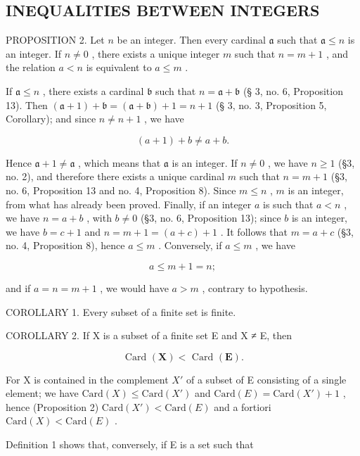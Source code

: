 \subsection{INEQUALITIES BETWEEN INTEGERS}

PROPOSITION 2. Let \(n\) be an integer. Then every cardinal \(\mathfrak{a}\) such that \(\mathfrak{a} \leqslant n\) is an integer. If \(n \neq 0\) , there exists a unique integer \(m\) such that \(n = m + 1\) , and the relation \(a < n\) is equivalent to \(a \leqslant m\) .

If \(\mathfrak{a} \leqslant n\) , there exists a cardinal \(\mathfrak{b}\) such that \(n = \mathfrak{a} + \mathfrak{b}\) (§ 3, no. 6, Proposition 13). Then \((\mathfrak{a} + 1) + \mathfrak{b} = (\mathfrak{a} + \mathfrak{b}) + 1 = n + 1\) (§ 3, no. 3, Proposition 5, Corollary); and since \(n \neq n + 1\) , we have

\[
(a + 1) + b \neq a + b.
\]

Hence \(\mathfrak{a} + 1 \neq \mathfrak{a}\) , which means that \(\mathfrak{a}\) is an integer. If \(n \neq 0\) , we have \(n \geqslant 1\) (§3, no. 2), and therefore there exists a unique cardinal \(m\) such that \(n = m + 1\) (§3, no. 6, Proposition 13 and no. 4, Proposition 8). Since \(m \leqslant n\) , \(m\) is an integer, from what has already been proved. Finally, if an integer \(a\) is such that \(a < n\) , we have \(n = a + b\) , with \(b \neq 0\) (§3, no. 6, Proposition 13); since \(b\) is an integer, we have \(b = c + 1\) and \(n = m + 1 = (a + c) + 1\) . It follows that \(m = a + c\) (§3, no. 4, Proposition 8), hence \(a \leqslant m\) . Conversely, if \(a \leqslant m\) , we have

\[
a \leqslant m + 1 = n;
\]

and if \(a = n = m + 1\) , we would have \(a > m\) , contrary to hypothesis.

COROLLARY 1. Every subset of a finite set is finite.

COROLLARY 2. If X is a subset of a finite set E and X ≠ E, then

\[
\text { Card } (\mathbf {X}) <   \text { Card } (\mathbf {E}).
\]

For X is contained in the complement \(X'\) of a subset of E consisting of a single element; we have \(\text{Card}(X) \leqslant \text{Card}(X')\) and \(\text{Card}(E) = \text{Card}(X') + 1\) , hence (Proposition 2) \(\text{Card}(X') < \text{Card}(E)\) and a fortiori \(\text{Card}(X) < \text{Card}(E)\) .

Definition 1 shows that, conversely, if E is a set such that

